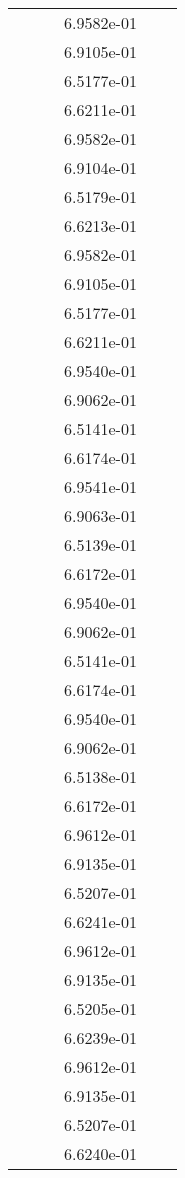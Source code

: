 \begin{xltabular}{\textwidth}{r|rS[table-format=1.3e+2]S[table-format=1.4e+2]S[table-format=1.4e+2]S[table-format=-1.5]}
&  &  & 6.9582e-01 & & \\
&  &  & 6.9105e-01 & & \\
&  &  & 6.5177e-01 & & \\
&  &  & 6.6211e-01 & & \\
&  &  & 6.9582e-01 & & \\
&  &  & 6.9104e-01 & & \\
&  &  & 6.5179e-01 & & \\
&  &  & 6.6213e-01 & & \\
&  &  & 6.9582e-01 & & \\
&  &  & 6.9105e-01 & & \\
&  &  & 6.5177e-01 & & \\
&  &  & 6.6211e-01 & & \\
&  &  & 6.9540e-01 & & \\
&  &  & 6.9062e-01 & & \\
&  &  & 6.5141e-01 & & \\
&  &  & 6.6174e-01 & & \\
&  &  & 6.9541e-01 & & \\
&  &  & 6.9063e-01 & & \\
&  &  & 6.5139e-01 & & \\
&  &  & 6.6172e-01 & & \\
&  &  & 6.9540e-01 & & \\
&  &  & 6.9062e-01 & & \\
&  &  & 6.5141e-01 & & \\
&  &  & 6.6174e-01 & & \\
&  &  & 6.9540e-01 & & \\
&  &  & 6.9062e-01 & & \\
&  &  & 6.5138e-01 & & \\
&  &  & 6.6172e-01 & & \\
&  &  & 6.9612e-01 & & \\
&  &  & 6.9135e-01 & & \\
&  &  & 6.5207e-01 & & \\
&  &  & 6.6241e-01 & & \\
&  &  & 6.9612e-01 & & \\
&  &  & 6.9135e-01 & & \\
&  &  & 6.5205e-01 & & \\
&  &  & 6.6239e-01 & & \\
&  &  & 6.9612e-01 & & \\
&  &  & 6.9135e-01 & & \\
&  &  & 6.5207e-01 & & \\
&  &  & 6.6240e-01 & & \\

\end{xltabular}
